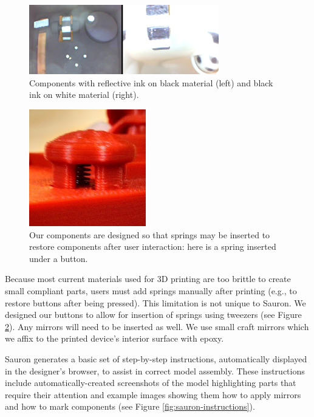 \begin{figure}
\centering
\includegraphics[width=3.25in]{figures/sauron/distinctive-materials.png}
\caption{Components with reflective ink on black material (left) and black ink on white material (right).}
\label{fig:sauron-distinctiveness}
\end{figure}

\begin{figure}
\centering
\includegraphics[width=2in]{figures/sauron/button-spring.jpg}
\caption{Our components are designed so that springs may be inserted to restore components after user interaction: here is a spring inserted under a button.}
\label{fig:sauron-spring}
\end{figure}

Because most current materials used for 3D printing are too brittle to create small compliant parts, users must add springs manually after printing (e.g., to restore buttons after being pressed). This limitation is not unique to Sauron. We designed our buttons to allow for insertion of springs using tweezers (see Figure \ref{fig:sauron-spring}). Any mirrors will need to be inserted as well. We use small craft mirrors which we affix to the printed device's interior surface with epoxy.

Sauron generates a basic set of step-by-step instructions, automatically displayed in the designer's browser, to assist in correct model assembly. These instructions include automatically-created screenshots of the model highlighting parts that require their attention and example images showing them how to apply mirrors and how to mark components (see Figure \ref{fig:sauron-instructions}).%

